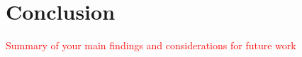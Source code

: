\documentclass[twocolumn,11pt]{article}
\begin{document}
\section{Conclusion}
\textcolor{red}{Summary of your main findings and considerations for future work}



\end{document}
